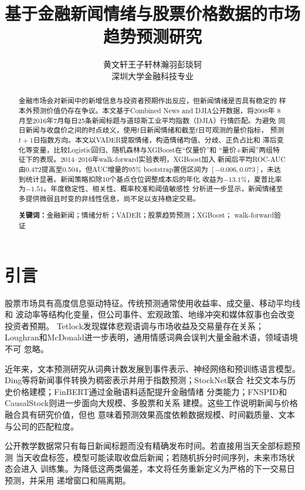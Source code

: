 \documentclass[UTF8,a4paper,9pt,twocolumn,fontset=none]{ctexart}
\title{\vspace{-1.2cm}\textbf{基于金融新闻情绪与股票价格数据的市场趋势预测研究}}
\author{黄文轩\quad 王子轩\quad 林瀚羽\quad 彭琰轲\\
\small 深圳大学金融科技专业}
\date{}
\begin{document}
\maketitle
\vspace{-1.7em}
\begin{abstract}
\small
金融市场会对新闻中的新增信息与投资者预期作出反应，但新闻情绪是否具有稳定的
样本外预测价值仍存在争议。本文基于Combined News and DJIA公开数据，将2008年
8月至2016年7月每日25条新闻标题与道琼斯工业平均指数（DJIA）行情匹配。为避免
同日新闻与收盘价之间的时点歧义，使用$t$日新闻情绪和截至$t$日可观测的量价指标，
预测$t+1$日指数方向。本文以VADER提取情绪，构造情绪均值、分歧、正负占比和
滞后变化等变量，比较Logistic回归、随机森林与XGBoost在“仅量价”和
“量价+新闻”两组特征下的表现。2014--2016年walk-forward实验表明，XGBoost加入
新闻后平均ROC-AUC由0.472提高至0.504，但AUC增量的95\% bootstrap置信区间为
$[-0.006,0.073]$，未达到统计显著。新闻策略扣除10个基点仓位调整成本后的年化
收益为$-13.1\%$，夏普比率为$-1.51$。年度稳定性、相关性、概率校准和阈值敏感性
分析进一步显示，新闻情绪至多提供微弱且时变的非线性信息，尚不足以支持稳定交易。

\noindent\textbf{关键词：}金融新闻；情绪分析；VADER；股票趋势预测；XGBoost；
walk-forward验证
\end{abstract}
\vspace{0.4em}

\section{引言}

股票市场具有高度信息驱动特征。传统预测通常使用收益率、成交量、移动平均线和
波动率等结构化变量，但公司事件、宏观政策、地缘冲突和媒体叙事也会改变投资者预期。
Tetlock发现媒体悲观语调与市场收益及交易量存在关系\cite{tetlock}；
Loughran和McDonald进一步表明，通用情感词典会误判大量金融术语，领域语境不可
忽略\cite{lm}。

近年来，文本预测研究从词典计数发展到事件表示、神经网络和预训练语言模型。
Ding等将新闻事件转换为稠密表示并用于指数预测\cite{ding2015}；StockNet联合
社交文本与历史价格建模\cite{stocknet}；FinBERT通过金融语料适配提升金融情绪
分类能力\cite{finbert}；FNSPID和CausalStock则进一步面向大规模、多股票和关系
建模\cite{fnspid,causalstock}。这些工作说明新闻与价格融合具有研究价值，但也
意味着预测效果高度依赖数据规模、时间戳质量、文本与公司的匹配粒度。

公开教学数据常只有每日新闻标题而没有精确发布时间。若直接用当天全部标题预测
当天收盘标签，模型可能读取收盘后新闻；若随机拆分时间序列，未来市场状态会进入
训练集。为降低这两类偏差，本文将任务重新定义为严格的下一交易日预测，并采用
递增窗口和隔离期。
\end{document}
